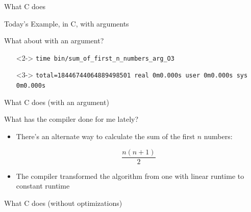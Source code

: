\documentclass[12pt, aspectration=169]{beamer}
\begin{document}
    \begin{frame}{What C does}
        
    \end{frame}

    \begin{frame}{Today's Example, in C, with arguments}
        
    \end{frame}

    \begin{frame}{What about with an argument?}
        \begin{itemize}
            \item[]<2-> \texttt{time bin/sum\_of\_first\_n\_numbers\_arg\_O3\newline}
            \item[]<3-> \texttt{total=18446744064889498501\newline
            real 0m0.000s\newline
            user 0m0.000s\newline
            sys 0m0.000s\newline}
        \end{itemize}
    \end{frame}

    \begin{frame}{What C does (with an argument)}
        
    \end{frame}

    \begin{frame}{What has the compiler done for me lately?}
        \begin{itemize}
            \item There's an alternate way to calculate the sum of the first $n$ numbers:
            \item[] \[\frac{n(n + 1)}{2}\]
            \item The compiler transformed the algorithm from one with linear runtime to constant runtime
        \end{itemize}
    \end{frame}

    \begin{frame}{What C does (without optimizations)}
        
    \end{frame}
\end{document}
